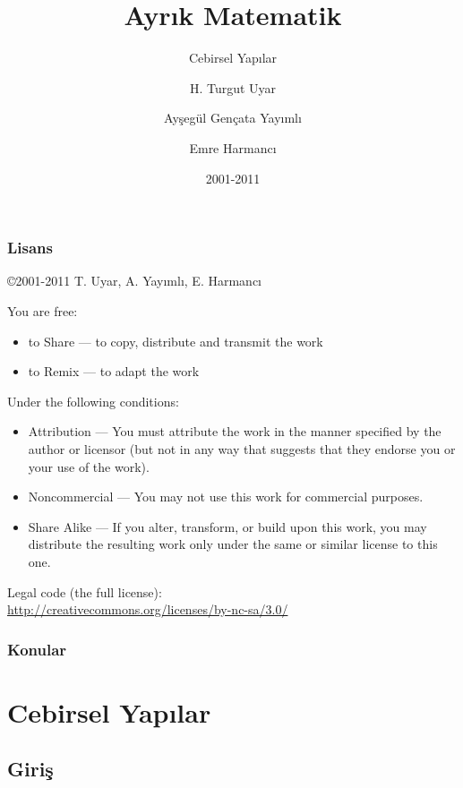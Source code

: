 \documentclass[dvipsnames]{beamer}
\title{Ayrık Matematik}
\subtitle{Cebirsel Yapılar}
\author{H. Turgut Uyar \and Ayşegül Gençata Yayımlı \and Emre Harmancı}
\date{2001-2011}
\theoremstyle{definition}
\theoremstyle{example}
\theoremstyle{plain}
\begin{document}
\begin{frame}
  \titlepage
\end{frame}

\begin{frame}
  \frametitle{Lisans}

  \hfill
  \copyright 2001-2011 T. Uyar, A. Yayımlı, E. Harmancı

  \vfill
  \begin{tiny}
    You are free:
    \begin{itemize}
      \item to Share — to copy, distribute and transmit the work
      \item to Remix — to adapt the work
    \end{itemize}

    Under the following conditions:
    \begin{itemize}
      \item Attribution — You must attribute the work in the manner specified by
        the author or licensor (but not in any way that suggests that they
        endorse you or your use of the work).

      \item Noncommercial — You may not use this work for commercial purposes.

      \item Share Alike — If you alter, transform, or build upon this work, you
        may distribute the resulting work only under the same or similar license
        to this one.
    \end{itemize}
  \end{tiny}

  \vfill
  Legal code (the full license):\\
  \url{http://creativecommons.org/licenses/by-nc-sa/3.0/}
\end{frame}

\begin{frame}
  \frametitle{Konular}
  \tableofcontents
\end{frame}

\section{Cebirsel Yapılar}

\subsection{Giriş}
\end{document}
